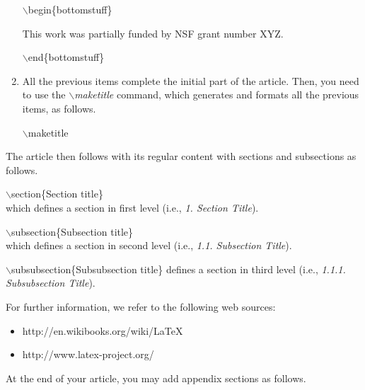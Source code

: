 \documentclass[jidm,a4paper]{jidm} %
\newenvironment{latexcode}
{\ttfamily\vspace{0.1in}\setlength{\parindent}{18pt}}
{\vspace{0.1in}}
\begin{document}
\begin{enumerate}
	\begin{latexcode}
		$\backslash$begin\{bottomstuff\}
	
		This work was partially funded by NSF grant number XYZ. 
	
		$\backslash$end\{bottomstuff\}	
	\end{latexcode}
	
	\item All the previous items complete the initial part of the article. Then, you need to use the \textit{$\backslash$maketitle} command, which generates and formats all the previous items, as follows.
	
		\begin{latexcode}
	   $\backslash$maketitle
	\end{latexcode}
\end{enumerate}


The article then follows with its regular content with sections and subsections as follows.

	\begin{latexcode}
		$\backslash$section\{Section title\} \\
		\rmfamily which defines a section in first level (i.e., \textit{1. Section Title}).
	
		\ttfamily$\backslash$subsection\{Subsection title\} \\
		\rmfamily which defines a section in second level (i.e., \textit{1.1. Subsection Title}).
	
		\ttfamily$\backslash$subsubsection\{Subsubsection title\} 
		\rmfamily defines a section in third level (i.e., \textit{1.1.1. Subsubsection Title}).
	\end{latexcode}

	For further information, we refer to the following web sources:
	
	\ttfamily
\begin{itemize}
	\item http://en.wikibooks.org/wiki/LaTeX
	\item http://www.latex-project.org/
\end{itemize}
	
	\rmfamily


At the end of your article, you may add appendix sections as follows.
\end{document}
